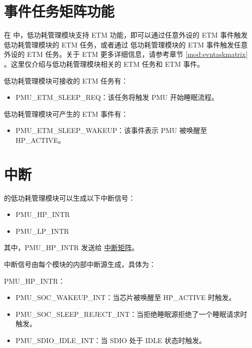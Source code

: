 \documentclass[main\_\_CN.tex]{subfiles}
\begin{document}

\section{事件任务矩阵功能} \label{sec:lowpowm-etm-func}

在 \chipname{} 中，低功耗管理模块支持 ETM 功能，即可以通过任意外设的 ETM 事件触发 低功耗管理模块的 ETM 任务，或者通过 低功耗管理模块的 ETM 事件触发任意外设的 ETM 任务。关于 ETM 更多详细信息，请参考章节 \ref{mod:evntaskmatrix} \textit{}。这里仅介绍与低功耗管理模块相关的 ETM 任务和 ETM 事件。

低功耗管理模块可接收的 ETM 任务有：

\begin{itemize}
\item PMU\_ETM\_SLEEP\_REQ：该任务将触发 PMU 开始睡眠流程。
\end{itemize}

低功耗管理模块可产生的 ETM 事件有：

\begin{itemize}
\item PMU\_ETM\_SLEEP\_WAKEUP：该事件表示 PMU 被唤醒至 HP\_ACTIVE。
\end{itemize}


\section{中断}

\chipname{} 的低功耗管理模块可以生成以下中断信号：

\begin{itemize}
    \item PMU\_HP\_INTR
    \item PMU\_LP\_INTR
\end{itemize}

其中，PMU\_HP\_INTR 发送给 \hyperref[mod:intmtrx]{中断矩阵}。

中断信号由每个模块的内部中断源生成，具体为：

PMU\_HP\_INTR：

\begin{itemize}
\item \label{int:PMUSOCWAKEUPINT}PMU\_SOC\_WAKEUP\_INT：当芯片被唤醒至 HP\_ACTIVE 时触发。

\item \label{int:PMUSOCSLEEPREJECTINT}PMU\_SOC\_SLEEP\_REJECT\_INT：当拒绝睡眠源拒绝了一个睡眠请求时触发。

\item \label{int:PMUSDIOIDLEINT}PMU\_SDIO\_IDLE\_INT：当 SDIO 处于 IDLE 状态时触发。
\end{itemize}
\end{document}
